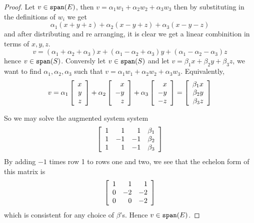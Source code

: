 \newpage
\question 
\begin{proof}
    Let $v \in \spa (E)$, then $v = \alpha_1 w_1 + \alpha_2 w_2 + \alpha_3 w_3$ then by substituting in the definitions of $w_i$ we get 
    \[\alpha_1 (x + y + z) + \alpha_2(x - y + z) + \alpha_3 (x - y - z)\]
    and after distributing and re arranging, it is clear we get a linear combinition in terms of $x, y, z$. 
    \[v = (\alpha_1 + \alpha_2 + \alpha_3)x + (\alpha_1 - \alpha_2 + \alpha_3)y + (\alpha_1 - \alpha_2 - \alpha_3)z\]
    hence $v \in \spa(S)$. Conversly let $v \in \spa(S)$ and let $v = \beta_1 x + \beta_2 y + \beta_3 z$, we want to find 
    $\alpha_1, \alpha_2, \alpha_3$ such that $v = \alpha_1 w_1 + \alpha_2 w_2 + \alpha_3 w_3$. 
    Equivalently, 
    \begin{equation}
        v = \alpha_1 
        \mat{r} x \\ 
        y \\ 
        z 
        \rix +  
        \alpha_2 \mat{r} 
        x \\ 
        -y \\ 
        z 
        \rix +  \alpha_3 
        \mat{r} 
        x \\
        -y \\
        -z 
        \rix = 
        \mat{r} 
        \beta_1x \\ 
        \beta_2y \\ 
        \beta_3z 
        \rix
    \end{equation}

    So we may solve the augmented system system 
    \begin{equation}
        \mat{rrrr} 
        1 & 1 & 1 & \beta_1 \\ 
        1 & -1 & - 1 & \beta_2 \\ 
        1 & 1 & -1 & \beta_3 
        \rix
    \end{equation}
    By adding $-1$ times row 1 to rows one and two, we see that the echelon form of this matrix is 
    \begin{equation}
        \mat{rrr} 
        1 & 1 & 1  \\ 
        0 & -2 & -2  \\ 
         0& 0 & -2 
        \rix
    \end{equation}
    which is consistent for any choice of $\beta$'s. Hence $v \in \spa(E)$. 
\end{proof}

\newpage 



